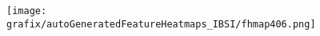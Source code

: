\hspace{\hsp} 
\begin{subfigure}{\wid\textwidth} 
    \centering 
    \caption{\tiny \sffamily {}} 
    \vspace{\vsp} 
    \texttt{[image: grafix/autoGeneratedFeatureHeatmaps\_IBSI/fhmap406.png]} 
\end{subfigure} 
\hspace{\hsp} 
